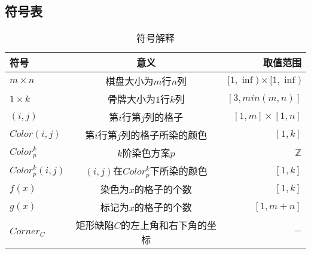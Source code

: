 \subsection{符号表}
\begin{table}[htbp]
    \centering
    \caption{符号解释}
    \begin{tabular}{lcr}
        \toprule
        符号                & 意义                         & 取值范围                          \\
        \midrule
        $m \times n$      & 棋盘大小为$m$行$n$列              & $[1, \inf) \times [1, \inf) $ \\
        $1 \times k $     & 骨牌大小为$1$行$k$列              & $[3, min(m, n)]$              \\
        $(i, j)$          & 第$i$行第$j$列的格子              & $[1, m] \times [1, n]$        \\
        $Color(i, j)$     & 第$i$行第$j$列的格子所染的颜色         & $[1, k]$                      \\
        $Color^k_p$       & $k$阶染色方案$p$                & $\mathbb{Z}$                  \\
        $Color^k_p(i, j)$ & $(i, j)$在$Color^k_p$下所染的颜色 & $[1, k]$                      \\
        $f(x)$            & 染色为$x$的格子的个数               & $[1, k]$                      \\
        $g(x)$            & 标记为$x$的格子的个数               & $[1, m + n]$                  \\
        $Corner_C$        & 矩形缺陷$C$的左上角和右下角的坐标         & $-$                           \\
        \bottomrule
    \end{tabular}
\end{table}